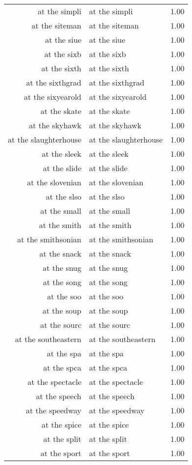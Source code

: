 \begin{table}[ht]
\begin{tabular}{rlr}
  at the simpli & at the simpli & 1.00 \\ 
  at the siteman & at the siteman & 1.00 \\ 
  at the siue & at the siue & 1.00 \\ 
  at the sixb & at the sixb & 1.00 \\ 
  at the sixth & at the sixth & 1.00 \\ 
  at the sixthgrad & at the sixthgrad & 1.00 \\ 
  at the sixyearold & at the sixyearold & 1.00 \\ 
  at the skate & at the skate & 1.00 \\ 
  at the skyhawk & at the skyhawk & 1.00 \\ 
  at the slaughterhouse & at the slaughterhouse & 1.00 \\ 
  at the sleek & at the sleek & 1.00 \\ 
  at the slide & at the slide & 1.00 \\ 
  at the slovenian & at the slovenian & 1.00 \\ 
  at the slso & at the slso & 1.00 \\ 
  at the small & at the small & 1.00 \\ 
  at the smith & at the smith & 1.00 \\ 
  at the smithsonian & at the smithsonian & 1.00 \\ 
  at the snack & at the snack & 1.00 \\ 
  at the snug & at the snug & 1.00 \\ 
  at the song & at the song & 1.00 \\ 
  at the soo & at the soo & 1.00 \\ 
  at the soup & at the soup & 1.00 \\ 
  at the sourc & at the sourc & 1.00 \\ 
  at the southeastern & at the southeastern & 1.00 \\ 
  at the spa & at the spa & 1.00 \\ 
  at the spca & at the spca & 1.00 \\ 
  at the spectacle & at the spectacle & 1.00 \\ 
  at the speech & at the speech & 1.00 \\ 
  at the speedway & at the speedway & 1.00 \\ 
  at the spice & at the spice & 1.00 \\ 
  at the split & at the split & 1.00 \\ 
  at the sport & at the sport & 1.00 \\ 

\end{tabular}
\end{table}
